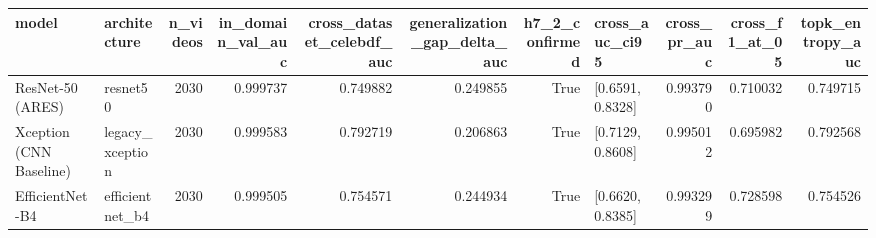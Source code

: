 \begin{tabular}{llrrrrrlrrr}
\toprule
model & architecture & n_videos & in_domain_val_auc & cross_dataset_celebdf_auc & generalization_gap_delta_auc & h7_2_confirmed & cross_auc_ci95 & cross_pr_auc & cross_f1_at_05 & topk_entropy_auc \\
\midrule
ResNet-50 (ARES) & resnet50 & 2030 & 0.999737 & 0.749882 & 0.249855 & True & [0.6591, 0.8328] & 0.993790 & 0.710032 & 0.749715 \\
Xception (CNN Baseline) & legacy_xception & 2030 & 0.999583 & 0.792719 & 0.206863 & True & [0.7129, 0.8608] & 0.995012 & 0.695982 & 0.792568 \\
EfficientNet-B4 & efficientnet_b4 & 2030 & 0.999505 & 0.754571 & 0.244934 & True & [0.6620, 0.8385] & 0.993299 & 0.728598 & 0.754526 \\
\bottomrule
\end{tabular}

